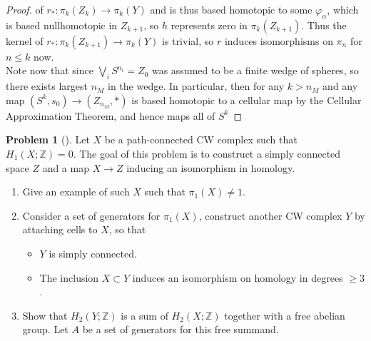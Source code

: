 \documentclass[reqno]{amsart}
\theoremstyle{definition}
\newtheorem{problem}[theorem]{Problem}
\theoremstyle{remark}
\begin{document}
\begin{proof}
        of $r_* \colon
        \pi_{k}(Z_k) \to \pi_k(Y)$ 
        and is thus based homotopic to some $\varphi_{\alpha}$,
        which is based nullhomotopic in $Z_{k+1}$, so
        $h$ represents zero in
        $\pi_k \left( Z_{k+1} \right) $.
        Thus the kernel
        of $r_* \colon \pi_k \left( Z_{k+1} \right) 
        \to \pi_k (Y)$ is trivial, so
        $r$ induces isomorphisms on $\pi_n$ for 
        $n\le k$ now.\\
        Note now that
        since $\bigvee_i S^{n_i} = Z_0$ was assumed 
        to be a finite wedge of spheres, so
        there exists largest $n_M$ in the wedge.
        In particular, then for any $k > n_M$ and
        any map $\left( S^{k}, s_0 \right) \to 
        (Z_{n_M}, *)$ is based homotopic to a cellular
        map by the Cellular Approximation Theorem, and
        hence maps all of $S^{k}$ 
    \end{proof}


    \begin{problem}[]
        Let $X$ be a path-connected CW complex such that
        $H_1 \left( X ; \mathbb{Z} \right) = 0$.
        The goal of this problem is to construct a
        simply connected space $Z$ and a map
        $X \to Z$ inducing an isomorphism in homology.
        \begin{enumerate}
            \item Give an example of such $X$ such that
                $\pi_1 \left( X \right) \neq 1$.
            \item Consider a set of generators
                for $\pi_1 (X)$, construct another
                CW complex $Y$ by attaching cells to $X$,
                so that
                \begin{itemize}
                    \item $Y$ is simply connected.
                    \item The inclusion $X \subset Y$ 
                        induces an isomorphism on homology
                        in degrees $\ge 3$.
                \end{itemize}
            \item Show that $H_2 \left( Y ; \mathbb{Z} \right) $ 
                is a sum of $H_2 \left( X; \mathbb{Z} \right) $ 
                together with a free abelian group.
                Let $A$ be a set of generators for this
                free summand.
        \end{enumerate}
    \end{problem}
\end{document}
